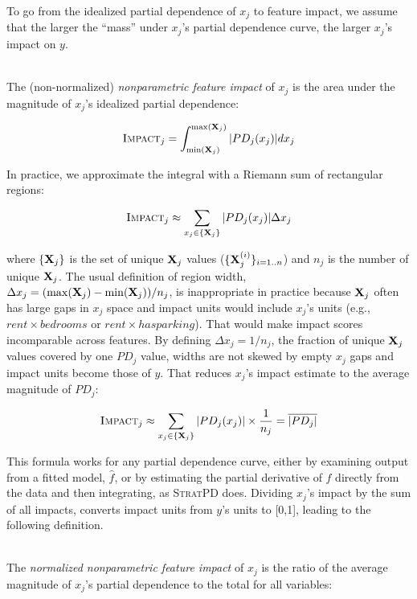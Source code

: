 \documentclass[smallextended]{svjour3}       %
\newcommand{\Imp}{\fontfamily{cmr}\textsc{Impact}}
\newcommand{\spd}{\fontfamily{cmr}\textsc{\small StratPD}}
\begin{document}
To go from the idealized partial dependence of $x_j$ to feature impact, we assume that the larger the ``mass'' under $x_j$'s partial dependence curve, the larger $x_j$'s impact on $y$.

~\\
 The (non-normalized) {\em nonparametric feature impact} of $x_j$ is the area under the magnitude of $x_j$'s idealized partial dependence:

\begin{equation}
\Imp_j = \int_{\min({\bf X}_j)}^{\max({\bf X}_j)} |PD_j(x_j)| dx_j
\end{equation}

\noindent In practice, we approximate the integral with a Riemann sum of rectangular regions:

\begin{equation}
\Imp_j \approx \sum_{x_j \in \{{\bf X}_j\}} |PD_j(x_j)| \Delta x_j
\end{equation}

\noindent  where $\{{\bf X}_j\}$ is the set of unique ${\bf X}_j$ values ($\{{\bf X}_j^{(i)}\}_{i=1..n}$) and $n_j$ is the number of unique ${\bf X}_j$. 
The usual definition of region width, $\Delta x_j = {(\max({\bf X}_j) - \min({\bf X}_j))}/{n_j}$, is inappropriate in practice because ${\bf X}_j$ often has large gaps in $x_j$ space and impact units would include $x_j$'s units (e.g., $rent \times bedrooms$ or $rent \times hasparking$). That would make impact scores incomparable across features. By defining $\Delta x_j = 1/n_j$, the fraction of unique ${\bf X}_j$ values covered by one $PD_j$ value, widths are not skewed by empty $x_j$ gaps and impact units become those of $y$. That reduces $x_j$'s impact estimate to the average magnitude of $PD_j$:

\[
\Imp_j \approx  \sum_{x_j \in \{{\bf X}_j\}} |PD_j(x_j)| \times \frac{1}{n_j} = \overline{|PD_j|}
\]

\noindent This formula works for any partial dependence curve, either by examining output from a fitted model, $\hat{f}$, or by estimating the partial derivative of $f$ directly from the data and then integrating, as \spd{} does. Dividing $x_j$'s impact by the sum of all impacts, converts impact units from $y$'s units to [0,1], leading to the following definition.

~\\
 The {\em normalized nonparametric feature impact} of $x_j$ is the ratio of the average magnitude of $x_j$'s partial dependence to the total for all variables:
\end{document}
